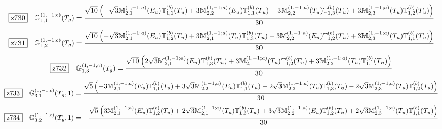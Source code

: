\documentclass[fleqn,10pt,landscape]{jsarticle}
\begin{document}
\begin{dmath*}
\hspace*{3mm}\fbox{z730}\quad \mathbb{G}_{1,1}^{(1,-1;c)}(T_{g})=\frac{\sqrt{10} \left(- \sqrt{3} \mathbb{M}_{2,1}^{(1,-1;a)}(E_{u}) \mathbb{T}_{1,1}^{(b)}(T_{u}) + 3 \mathbb{M}_{2,2}^{(1,-1;a)}(E_{u}) \mathbb{T}_{1,1}^{(b)}(T_{u}) + 3 \mathbb{M}_{2,2}^{(1,-1;a)}(T_{u}) \mathbb{T}_{1,3}^{(b)}(T_{u}) + 3 \mathbb{M}_{2,3}^{(1,-1;a)}(T_{u}) \mathbb{T}_{1,2}^{(b)}(T_{u})\right)}{30}
\end{dmath*}
\begin{dmath*}
\hspace*{3mm}\fbox{z731}\quad \mathbb{G}_{1,2}^{(1,-1;c)}(T_{g})=\frac{\sqrt{10} \left(- \sqrt{3} \mathbb{M}_{2,1}^{(1,-1;a)}(E_{u}) \mathbb{T}_{1,2}^{(b)}(T_{u}) + 3 \mathbb{M}_{2,1}^{(1,-1;a)}(T_{u}) \mathbb{T}_{1,3}^{(b)}(T_{u}) - 3 \mathbb{M}_{2,2}^{(1,-1;a)}(E_{u}) \mathbb{T}_{1,2}^{(b)}(T_{u}) + 3 \mathbb{M}_{2,3}^{(1,-1;a)}(T_{u}) \mathbb{T}_{1,1}^{(b)}(T_{u})\right)}{30}
\end{dmath*}
\begin{dmath*}
\hspace*{3mm}\fbox{z732}\quad \mathbb{G}_{1,3}^{(1,-1;c)}(T_{g})=\frac{\sqrt{10} \left(2 \sqrt{3} \mathbb{M}_{2,1}^{(1,-1;a)}(E_{u}) \mathbb{T}_{1,3}^{(b)}(T_{u}) + 3 \mathbb{M}_{2,1}^{(1,-1;a)}(T_{u}) \mathbb{T}_{1,2}^{(b)}(T_{u}) + 3 \mathbb{M}_{2,2}^{(1,-1;a)}(T_{u}) \mathbb{T}_{1,1}^{(b)}(T_{u})\right)}{30}
\end{dmath*}
\begin{dmath*}
\hspace*{3mm}\fbox{z733}\quad \mathbb{G}_{3,1}^{(1,-1;c)}(T_{g},1)=\frac{\sqrt{5} \left(- 3 \mathbb{M}_{2,1}^{(1,-1;a)}(E_{u}) \mathbb{T}_{1,1}^{(b)}(T_{u}) + 3 \sqrt{3} \mathbb{M}_{2,2}^{(1,-1;a)}(E_{u}) \mathbb{T}_{1,1}^{(b)}(T_{u}) - 2 \sqrt{3} \mathbb{M}_{2,2}^{(1,-1;a)}(T_{u}) \mathbb{T}_{1,3}^{(b)}(T_{u}) - 2 \sqrt{3} \mathbb{M}_{2,3}^{(1,-1;a)}(T_{u}) \mathbb{T}_{1,2}^{(b)}(T_{u})\right)}{30}
\end{dmath*}
\begin{dmath*}
\hspace*{3mm}\fbox{z734}\quad \mathbb{G}_{3,2}^{(1,-1;c)}(T_{g},1)=- \frac{\sqrt{5} \left(3 \mathbb{M}_{2,1}^{(1,-1;a)}(E_{u}) \mathbb{T}_{1,2}^{(b)}(T_{u}) + 2 \sqrt{3} \mathbb{M}_{2,1}^{(1,-1;a)}(T_{u}) \mathbb{T}_{1,3}^{(b)}(T_{u}) + 3 \sqrt{3} \mathbb{M}_{2,2}^{(1,-1;a)}(E_{u}) \mathbb{T}_{1,2}^{(b)}(T_{u}) + 2 \sqrt{3} \mathbb{M}_{2,3}^{(1,-1;a)}(T_{u}) \mathbb{T}_{1,1}^{(b)}(T_{u})\right)}{30}
\end{dmath*}
\end{document}
